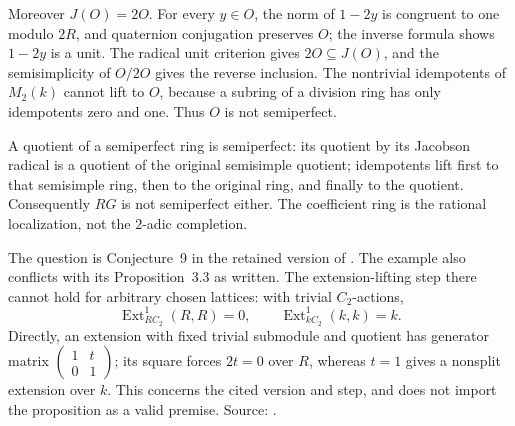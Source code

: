Moreover \(J(O)=2O\). For every \(y\in O\), the norm
of \(1-2y\) is congruent to one modulo \(2R\),
and quaternion conjugation preserves \(O\);
the inverse formula shows \(1-2y\) is a unit.
The radical unit criterion gives \(2O\subseteq J(O)\),
and the semisimplicity of \(O/2O\) gives the reverse
inclusion. The nontrivial idempotents of \(M_2(k)\)
cannot lift to \(O\), because a subring of a division
ring has only idempotents zero and one.
Thus \(O\) is not semiperfect.

A quotient of a semiperfect ring is semiperfect:
its quotient by its Jacobson radical is a quotient
of the original semisimple quotient; idempotents
lift first to that semisimple ring, then to the
original ring, and finally to the quotient.
Consequently \(RG\) is not semiperfect either.
The coefficient ring is the rational localization,
not the \(2\)-adic completion.

The question is Conjecture~9 in the retained version
of \cite{johnston-rumynin}. The example also conflicts
with its Proposition~3.3 as written. The extension-lifting
step there cannot hold for arbitrary chosen lattices:
with trivial \(C_2\)-actions,
\[
 \operatorname{Ext}^1_{RC_2}(R,R)=0,\qquad
 \operatorname{Ext}^1_{kC_2}(k,k)=k.
\]
Directly, an extension with fixed trivial submodule
and quotient has generator matrix
\(\left(\begin{smallmatrix}1&t\\0&1\end{smallmatrix}\right)\);
its square forces \(2t=0\) over \(R\), whereas
\(t=1\) gives a nonsplit extension over \(k\).
This concerns the cited version and step, and does
not import the proposition as a valid premise.
Source: .
